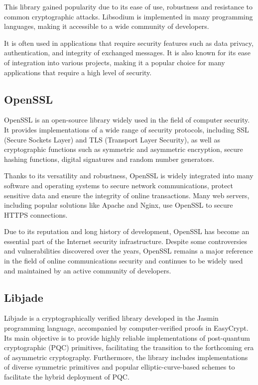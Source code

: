 \documentclass[runningheads]{llncs}
\begin{document}
This library gained popularity due to its ease of use, robustness and resistance to common cryptographic attacks. Libsodium is implemented in many programming languages, making it accessible to a wide community of developers.

It is often used in applications that require security features such as data privacy, authentication, and integrity of exchanged messages. It is also known for its ease of integration into various projects, making it a popular choice for many applications that require a high level of security.

\subsection{OpenSSL}

OpenSSL is an open-source library widely used in the field of computer security. It provides implementations of a wide range of security protocols, including SSL (Secure Sockets Layer) and TLS (Transport Layer Security), as well as cryptographic functions such as symmetric and asymmetric encryption, secure hashing functions, digital signatures and random number generators.

Thanks to its versatility and robustness, OpenSSL is widely integrated into many software and operating systems to secure network communications, protect sensitive data and ensure the integrity of online transactions. Many web servers, including popular solutions like Apache and Nginx, use OpenSSL to secure HTTPS connections.

Due to its reputation and long history of development, OpenSSL has become an essential part of the Internet security infrastructure. Despite some controversies and vulnerabilities discovered over the years, OpenSSL remains a major reference in the field of online communications security and continues to be widely used and maintained by an active community of developers.

\subsection{Libjade}

Libjade is a cryptographically verified library developed in the Jasmin programming language, accompanied by computer-verified proofs in EasyCrypt. Its main objective is to provide highly reliable implementations of post-quantum cryptographic (PQC) primitives, facilitating the transition to the forthcoming era of asymmetric cryptography. Furthermore, the library includes implementations of diverse symmetric primitives and popular elliptic-curve-based schemes to facilitate the hybrid deployment of PQC.
\end{document}
